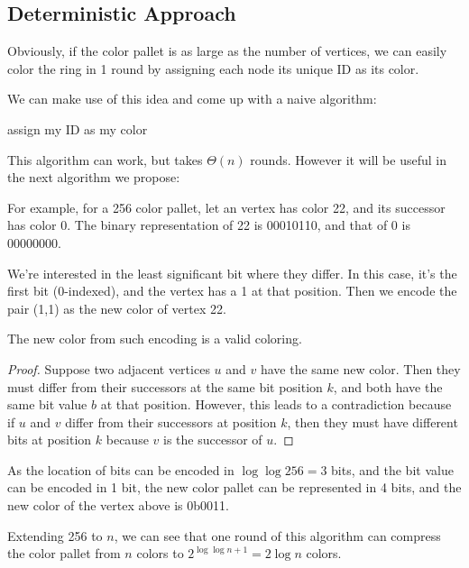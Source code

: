 \subsection{Deterministic Approach}

Obviously, if the color pallet is as large as the number of vertices, we can easily color the ring in 1 round by assigning each node its unique ID as its color.

We can make use of this idea and come up with a naive algorithm:

\begin{algorithm}[H]
  assign my ID as my color\;
  \caption{Slow Deterministic 3-coloring Algorithm Using IDs} \label{alg:slow-3-coloring}
\end{algorithm}

This algorithm can work, but takes $\Theta(n)$ rounds. However it will be useful in the next algorithm we propose:

For example, for a 256 color pallet, let an vertex has color 22, and its successor has color 0. The binary representation of 22 is 00010110, and that of 0 is 00000000. 

We're interested in the least significant bit where they differ. In this case, it's the first bit (0-indexed), and the vertex has a 1 at that position. Then we encode the pair (1,1) as the new color of vertex 22.

\begin{lemma}
  The new color from such encoding is a valid coloring.
\end{lemma}
\begin{proof}
Suppose two adjacent vertices $u$ and $v$ have the same new color. Then they must differ from their successors at the same bit position $k$, and both have the same bit value $b$ at that position. However, this leads to a contradiction because if $u$ and $v$ differ from their successors at position $k$, then they must have different bits at position $k$ because $v$ is the successor of $u$.
\end{proof}

As the location of bits can be encoded in $\log \log 256 = 3$ bits, and the bit value can be encoded in 1 bit, the new color pallet can be represented in 4 bits, and the new color of the vertex above is 0b0011.

Extending 256 to $n$, we can see that one round of this algorithm can compress the color pallet from $n$ colors to $2^{\log\log n + 1} = 2\log n$ colors.

